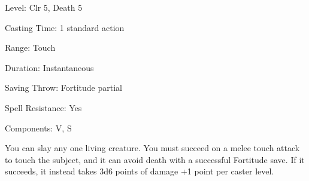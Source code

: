 
\begin{description*}
\item[Level:] Clr 5, Death 5
\item[Casting Time:] 1 standard action
\item[Range:] Touch
\item[Duration:] Instantaneous
\item[Saving Throw:] Fortitude partial
\item[Spell Resistance:] Yes
\item[Components:] V, S
\end{description*}

You can slay any one living creature. You must succeed on a melee touch attack
to touch the subject, and it can avoid death with a successful Fortitude save.
If it succeeds, it instead takes 3d6 points of damage +1 point per caster level.